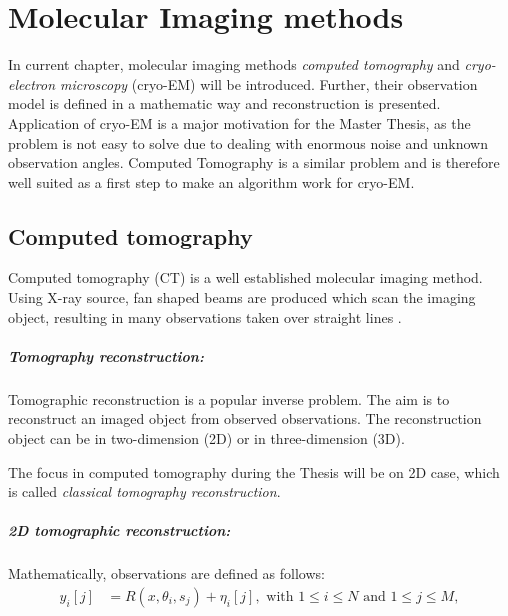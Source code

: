 \chapter{Molecular Imaging methods}
\label{sec:imaging}

In current chapter, molecular imaging methods \textit{computed tomography} and 
\textit{cryo-electron microscopy} (cryo-EM) will be introduced. 
Further, their observation model is defined in a mathematic way and reconstruction is presented.
Application of cryo-EM is a major motivation for the Master Thesis, 
as the problem is not easy to solve due to dealing with enormous noise and unknown observation angles.
Computed Tomography is a similar problem and is therefore well suited as a
first step to make an algorithm work for cryo-EM. 



\section{Computed tomography}
Computed tomography (CT) is a well established molecular imaging method.
Using X-ray source, fan shaped beams are produced which scan the imaging object,
resulting in many observations taken over straight lines \cite{computedTomography}.

\paragraph{Tomography reconstruction:}
Tomographic reconstruction \cite{tomographicReconstruction} is a popular inverse problem. 
The aim is to reconstruct an imaged object from observed observations.
The reconstruction object can be in two-dimension (2D) or in three-dimension (3D). 

\begin{tcolorbox}[colback=red!5!white,colframe=red!75!black]
    The focus in computed tomography during the Thesis will be on 2D case, which is called \textit{classical tomography reconstruction}.
\end{tcolorbox}

\paragraph{2D tomographic reconstruction:}

Mathematically, observations are defined as follows:
\begin{equation}
    \label{eq:2Dreconstruction}
    \begin{aligned}
        y_i[j] &= R(x, \theta_i, s_j) + \eta_i[j] , \text{ with } 1 \leq i \leq N \text{ and } 1 \leq j \leq M,
    \end{aligned}
\end{equation}


